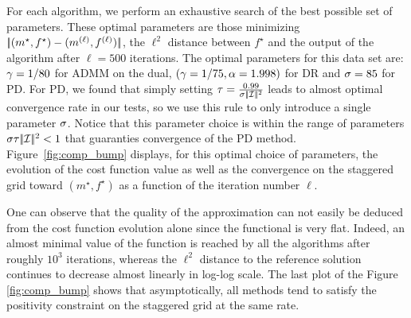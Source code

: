 For each algorithm, we perform an exhaustive search of the best possible set of parameters. These optimal parameters are those minimizing $|\!| (m^\star,f^\star) - ({m}^{(\ell)},{f}^{(\ell)}) |\!|$, the $\ell^2$ distance between $f^\star$ and the output of the algorithm after $\ell=500$ iterations. The optimal parameters for this data set are:  $\gamma=1/80$ for ADMM on the dual, $(\gamma=1/75,\alpha=1.998)$ for DR and $\sigma=85$ for PD. For PD, we found that simply setting $\tau=\frac{0.99}{\sigma |\!| \mathcal{I} |\!|^2}$ leads to almost optimal convergence rate in our tests, so we use this rule to only introduce a single parameter $\sigma$. Notice that this parameter choice is within the range of parameters $\sigma \tau |\!| \mathcal{I} |\!|^2<1$ that guaranties convergence of the PD method. Figure~\ref{fig:comp_bump} displays, for this optimal choice of parameters, the evolution of the cost function value as well as the  convergence on the staggered grid toward $(m^\star,f^\star)$ as a function of the iteration number $\ell$. 

One can observe that the quality of the approximation can not easily be deduced from the cost function  evolution alone since the functional is very flat. Indeed, an almost minimal value of the function  is reached by all the algorithms after roughly $10^3$ iterations, whereas the $\ell^2$ distance to the reference solution continues to decrease almost linearly in log-log scale. The last plot of the Figure \ref{fig:comp_bump} shows that asymptotically, all methods tend to satisfy the positivity constraint on the staggered grid at the same rate.

